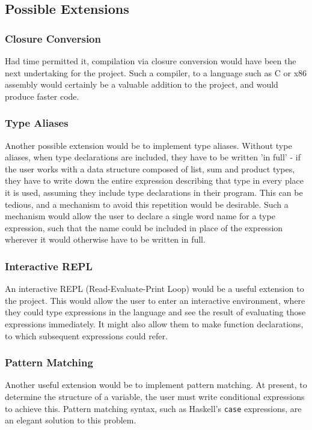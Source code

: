 \documentclass{article}
\begin{document}
\subsection{Possible Extensions}
\subsubsection{Closure Conversion}
Had time permitted it, compilation via closure conversion would have been the next undertaking for the project. Such a compiler, to a language such as C or x86 assembly would certainly be a valuable addition to the project, and would produce faster code.
\subsubsection{Type Aliases}
Another possible extension would be to implement type aliases. Without type aliases, when type declarations are included, they have to be written 'in full' - if the user works with a data structure composed of list, sum and product types, they have to write down the entire expression describing that type in every place it is used, assuming they include type declarations in their program. This can be tedious, and a mechanism to avoid this repetition would be desirable. Such a mechanism would allow the user to declare a single word name for a type expression, such that the name could be included in place of the expression wherever it would otherwise have to be written in full.
\subsubsection{Interactive REPL}
An interactive REPL (Read-Evaluate-Print Loop) would be a useful extension to the project. This would allow the user to enter an interactive environment, where they could type expressions in the language and see the result of evaluating those expressions immediately. It might also allow them to make function declarations, to which subsequent expressions could refer.
\subsubsection{Pattern Matching}
Another useful extension would be to implement pattern matching. At present, to determine the structure of a variable, the user must write conditional expressions to achieve this. Pattern matching syntax, such as Haskell's \texttt{case} expressions, are an elegant solution to this problem.
\end{document}
